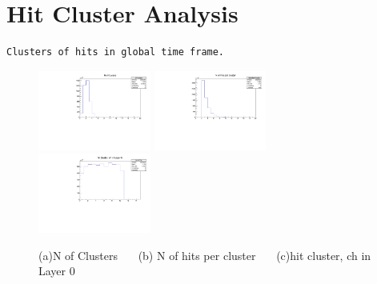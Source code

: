 \documentclass[a4paper,11pt]{article}
\theoremstyle{mytheor}
\begin{document}
\section{Hit Cluster Analysis} 
\begin{verbatim} 
Clusters of hits in global time frame. 
\end{verbatim} 
\begin{figure}[H] 
\vspace*{-0.3cm} 
\includegraphics[width=0.33\textwidth,scale=0.5,trim=0 0 0 0,clip]{plotsdir/file0_clusters-nClusters-1.pdf} 
\includegraphics[width=0.33\textwidth,scale=0.5,trim=0 0 0 0,clip]{plotsdir/file0_clusters-nHitsPerCluster-1.pdf} 
\includegraphics[width=0.33\textwidth,scale=0.5,trim=0 0 0 0,clip]{plotsdir/file0_clusters-hcL0Chs-1.pdf} 
\caption{(a)N of Clusters ~~~(b) N of hits per cluster ~~~(c)hit cluster, ch in Layer 0 } 
\end{figure} 
\end{document}
